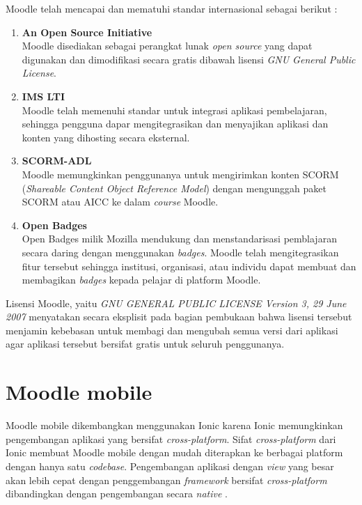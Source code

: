 Moodle telah mencapai dan mematuhi standar internasional sebagai berikut : \cite{moodle:standards}
		\begin{enumerate}
			\item \textbf{An Open Source Initiative} \\
				Moodle disediakan sebagai perangkat lunak \textit{open source} yang dapat digunakan dan dimodifikasi secara gratis dibawah lisensi \textit{GNU General Public License}.
			\item \textbf{IMS LTI\texttrademark} \\
				Moodle telah memenuhi standar untuk integrasi aplikasi pembelajaran, sehingga pengguna dapar mengitegrasikan dan menyajikan aplikasi dan konten yang dihosting secara eksternal.
			\item \textbf{SCORM-ADL} \\
				Moodle memungkinkan penggunanya untuk mengirimkan konten SCORM (\textit{Shareable Content Object Reference Model}) dengan mengunggah paket SCORM atau AICC ke dalam \textit{course} Moodle.
	
			\item \textbf{Open Badges} \\
				Open Badges milik Mozilla mendukung dan menstandarisasi pemblajaran secara daring dengan menggunakan \textit{badges}. Moodle telah mengitegrasikan fitur tersebut sehingga institusi, organisasi, atau individu dapat membuat dan membagikan \textit{badges} kepada pelajar di platform Moodle.
		\end{enumerate}

Lisensi Moodle, yaitu \textit{GNU GENERAL PUBLIC LICENSE Version 3, 29 June 2007} menyatakan secara eksplisit pada bagian pembukaan bahwa lisensi tersebut menjamin kebebasan untuk membagi dan mengubah semua versi dari aplikasi agar aplikasi tersebut bersifat gratis untuk seluruh penggunanya\cite{GNU:preamble}.
\section{Moodle mobile}
\label{sec:Moodle mobile}
Moodle mobile dikembangkan menggunakan Ionic karena Ionic memungkinkan pengembangan aplikasi yang bersifat \textit{cross-platform}\cite{Ionic:intro}. Sifat \textit{cross-platform} dari Ionic membuat Moodle mobile dengan mudah diterapkan ke berbagai platform dengan hanya satu \textit{codebase}. Pengembangan aplikasi dengan \textit{view} yang besar akan lebih cepat dengan penggembangan \textit{framework} bersifat \textit{cross-platform} dibandingkan dengan pengembangan secara \textit{native} \cite{cross-platform}. 

